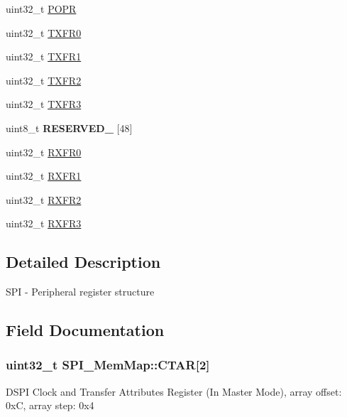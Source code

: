 \begin{DoxyCompactItemize}
\begin{tabbing}
\end{tabbing}\item 
uint32\+\_\+t \hyperlink{struct_s_p_i___mem_map_a04b56f8ca2e50d92647fc7b7e2d98715}{P\+O\+P\+R}
\item 
uint32\+\_\+t \hyperlink{struct_s_p_i___mem_map_aa234b528e26469e3bafea1dfecff1dfe}{T\+X\+F\+R0}
\item 
uint32\+\_\+t \hyperlink{struct_s_p_i___mem_map_aa4c8bc4c6c43cb03d266084ead4948f6}{T\+X\+F\+R1}
\item 
uint32\+\_\+t \hyperlink{struct_s_p_i___mem_map_a2e65235ded22e36d3dae2b17f172a32b}{T\+X\+F\+R2}
\item 
uint32\+\_\+t \hyperlink{struct_s_p_i___mem_map_a817203724ca73f53cc544f887eeabd27}{T\+X\+F\+R3}
\item 
\hypertarget{struct_s_p_i___mem_map_a33bd56ff10ea05fe1c8c8b7f6a2ae503}{}uint8\+\_\+t {\bfseries R\+E\+S\+E\+R\+V\+E\+D\+\_} \mbox{[}48\mbox{]}\label{struct_s_p_i___mem_map_a33bd56ff10ea05fe1c8c8b7f6a2ae503}

\item 
uint32\+\_\+t \hyperlink{struct_s_p_i___mem_map_ad396a1654fca8d4b350357ebcef159af}{R\+X\+F\+R0}
\item 
uint32\+\_\+t \hyperlink{struct_s_p_i___mem_map_a40b7b381e217d2602c20861e371511fd}{R\+X\+F\+R1}
\item 
uint32\+\_\+t \hyperlink{struct_s_p_i___mem_map_a3839ee0fb2cf1f0389bdaf447dcd6760}{R\+X\+F\+R2}
\item 
uint32\+\_\+t \hyperlink{struct_s_p_i___mem_map_adb8a4cbc6bff3380d9e817e5bb0e4fee}{R\+X\+F\+R3}
\end{DoxyCompactItemize}


\subsection{Detailed Description}
S\+P\+I -\/ Peripheral register structure 

\subsection{Field Documentation}
\hypertarget{struct_s_p_i___mem_map_afe52c1ebf9e5971e43fdfea50cf16a48}{}
\subsubsection[{C\+T\+A\+R}]{\setlength{\rightskip}{0pt plus 5cm}uint32\+\_\+t S\+P\+I\+\_\+\+Mem\+Map\+::\+C\+T\+A\+R\mbox{[}2\mbox{]}}\label{struct_s_p_i___mem_map_afe52c1ebf9e5971e43fdfea50cf16a48}
D\+S\+P\+I Clock and Transfer Attributes Register (In Master Mode), array offset\+: 0x\+C, array step\+: 0x4 \hypertarget{struct_s_p_i___mem_map_a4824e400ced2bf2bd5c89e95e7ef55d6}{}
